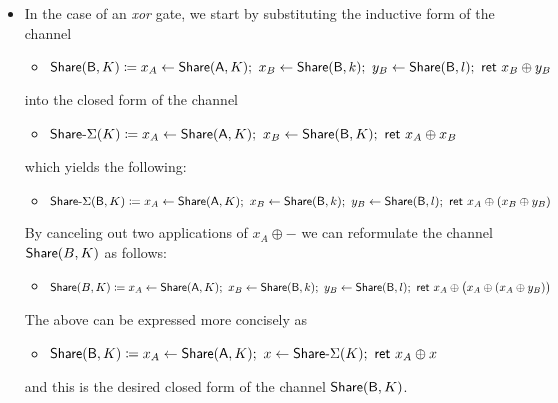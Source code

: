 \begin{itemize}
\item In the case of an \emph{xor} gate, we start by substituting the inductive form of the channel
\begin{itemize}
\item $\mathsf{Share}(\mathsf{B},K) \coloneqq x_A \leftarrow \mathsf{Share}(\mathsf{A},K); \ x_B \leftarrow \mathsf{Share}(\mathsf{B},k); \ y_B \leftarrow \mathsf{Share}(\mathsf{B},l); \ \mathsf{ret} \ x_B \oplus y_B$
\end{itemize}
into the closed form of the channel
\begin{itemize}
\item $\mathsf{Share}\textsf{-}\Sigma(K) \coloneqq x_A \leftarrow \mathsf{Share}(\mathsf{A},K); \ x_B \leftarrow \mathsf{Share}(\mathsf{B},K); \ \mathsf{ret} \ x_A \oplus x_B$
\end{itemize}
which yields the following:
\begin{itemize}
\item $\mathsf{Share}\textsf{-}\Sigma(\mathsf{B},K) \coloneqq x_A \leftarrow \mathsf{Share}(\mathsf{A},K); \ x_B \leftarrow \mathsf{Share}(\mathsf{B},k); \ y_B \leftarrow \mathsf{Share}(\mathsf{B},l); \ \mathsf{ret} \ x_A \oplus (x_B \oplus y_B)$
\end{itemize}
By canceling out two applications of $x_A \oplus -$ we can reformulate the channel $\mathsf{Share}(B,K)$ as follows:
\begin{itemize}
\item $\mathsf{Share}(B,K) \coloneqq x_A \leftarrow \mathsf{Share}(\mathsf{A},K); \ x_B \leftarrow \mathsf{Share}(\mathsf{B},k); \ y_B \leftarrow \mathsf{Share}(\mathsf{B},l); \ \mathsf{ret} \ x_A \oplus \big(x_A \oplus (x_A \oplus y_B)\big)$
\end{itemize}
The above can be expressed more concisely as
\begin{itemize}
\item $\mathsf{Share}(\mathsf{B},K) \coloneqq x_A \leftarrow \mathsf{Share}(\mathsf{A},K); \ x \leftarrow \mathsf{Share}\textsf{-}\Sigma(K); \ \mathsf{ret} \ x_A \oplus x$
\end{itemize}
and this is the desired closed form of the channel $\mathsf{Share}(\mathsf{B},K)$.


\end{itemize}
